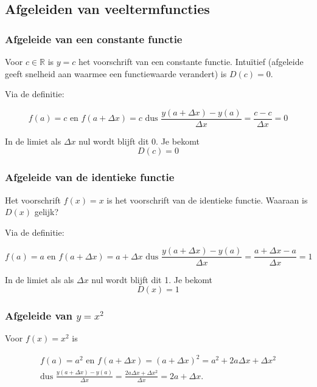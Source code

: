 \subsection{Afgeleiden van veeltermfuncties}

\subsubsection{Afgeleide van een constante functie}

Voor $c\in \mathbb{R}$ is $y=c$ het voorschrift van een constante functie.
Intu\"itief (afgeleide geeft snelheid aan waarmee een functiewaarde verandert) is $D(c)=0$.\vspace{3 mm}

Via de definitie:

\begin{equation*}
f(a)=c \text{ en } f(a+\Delta x)= c \text{ dus } \frac{y(a+ \Delta x)-y(a)}{\Delta x}=\frac {c-c}{\Delta x}=0
\end{equation*}

In de limiet als $\Delta x$ nul wordt blijft dit 0.
Je bekomt 
\[D(c)=0\]

\subsubsection{Afgeleide van de identieke functie}

Het voorschrift $f(x)=x$ is het voorschrift van de identieke functie.
Waaraan is $D(x)$ gelijk?\vspace{3mm}

Via de definitie:

\begin{equation*}
f(a)=a \text{ en } f(a+\Delta x)=a+\Delta x \text{ dus }\frac{y(a+\Delta x)-y(a)}{\Delta x}=\frac{a+\Delta x -a}{\Delta x}=1
\end{equation*}

In de limiet als als $\Delta x$ nul wordt blijft dit 1.
Je bekomt 
\[D(x)=1\]

\subsubsection{Afgeleide van $y=x^2$}

Voor $f(x)=x^2$ is

\begin{eqnarray*}
f(a)=a^2 \text{ en } f(a+\Delta x)=(a+\Delta x)^2=a^2+2a\Delta x + \Delta x^2 \\
\text{dus }
\frac{y(a+\Delta x)-y(a)}{\Delta x}=\frac{2a \Delta x +\Delta x^2}{\Delta x}=2a+ \Delta x.
\end{eqnarray*}

